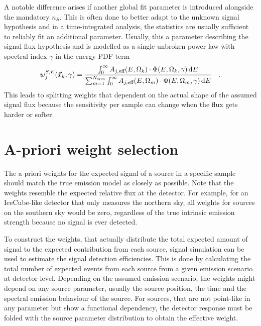 A notable difference arises if another global fit parameter is introduced alongside the mandatory $n_S$.
This is often done to better adapt to the unknown signal hypothesis and in a time-integrated analysis, the statistics are usually sufficient to reliably fit an additional parameter.
Usually, this a parameter describing the signal flux hypothesis and is modelled as a single unbroken power law with spectral index $\gamma$ in the energy PDF term
\begin{equation}
  w_j^{S,E}(\vec{x}_k, \gamma)
  = \frac
      {
        \int_0^\infty A_{j,\text{eff}}(E,\Omega_k)\cdot
          \Phi(E, \Omega_k, \gamma)\,\mathrm{d}E
      }
      {
        \sum_{m=1}^{N_\text{srcs}}
        \int_0^\infty A_{j,\text{eff}}(E,\Omega_m)\cdot
          \Phi(E, \Omega_m, \gamma)\,\mathrm{d}E
      }
  \quad\text{.}
\end{equation}
This leads to splitting weights that dependent on the actual shape of the assumed signal flux because the sensitivity per sample can change when the flux gets harder or softer.


\section{A-priori weight selection}
The a-priori weights for the expected signal of a source in a specific sample should match the true emission model as closely as possible.
Note that the weights resemble the expected relative flux at the detector.
For example, for an IceCube-like detector that only measures the northern sky, all weights for sources on the southern sky would be zero, regardless of the true intrinsic emission strength because no signal is ever detected.

To construct the weights, that actually distribute the total expected amount of signal to the expected contribution from each source, signal simulation can be used to estimate the signal detection efficiencies.
This is done by calculating the total number of expected events from each source from a given emission scenario at detector level.
Depending on the assumed emission scenario, the weights might depend on any source parameter, usually the source position, the time and the spectral emission behaviour of the source.
For sources, that are not point-like in any parameter but show a functional dependency, the detector response must be folded with the source parameter distribution to obtain the effective weight.

